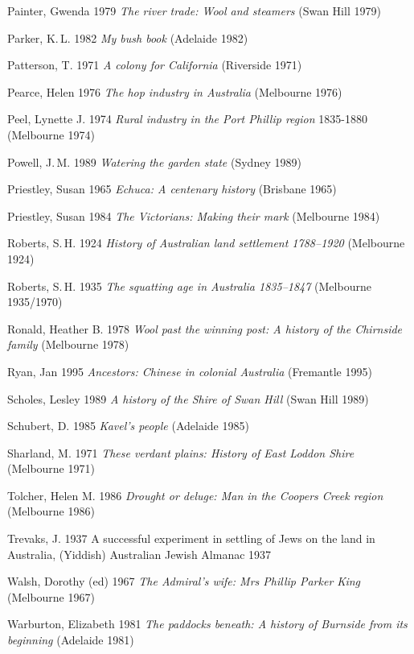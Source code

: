 Painter, Gwenda 1979 \textit{The river trade: Wool and steamers} (Swan
Hill 1979)

Parker, K.\,L.  1982 \textit{My bush book} (Adelaide 1982)

Patterson, T. 1971 \textit{A colony for California} (Riverside 1971)

Pearce, Helen 1976 \textit{The hop industry in Australia} (Melbourne
1976)

Peel, Lynette J. 1974 \textit{Rural industry in the Port Phillip
region} 1835-1880 (Melbourne 1974)

Powell, J.\,M. 1989 \textit{Watering the garden state} (Sydney 1989)

Priestley, Susan 1965 \textit{Echuca: A centenary history} (Brisbane
1965)

Priestley, Susan 1984 \textit{The Victorians: Making their mark}
(Melbourne 1984)

Roberts, S.\,H.  1924 \textit{History of Australian land settlement
1788--1920} (Melbourne 1924)

Roberts, S.\,H. 1935 \textit{The squatting age in Australia
1835--1847} (Melbourne 1935/1970)

Ronald, Heather B.  1978 \textit{Wool past the winning post: A history
of the Chirnside family} (Melbourne 1978)

Ryan, Jan 1995 \textit{Ancestors: Chinese in colonial Australia}
(Fremantle 1995)

Scholes, Lesley 1989 \textit{A history of the Shire of Swan Hill}
(Swan Hill 1989)

Schubert, D.  1985 \textit{Kavel's people} (Adelaide 1985)

Sharland, M.  1971 \textit{These verdant plains: History of East
Loddon Shire} (Melbourne 1971)

Tolcher, Helen M. 1986 \textit{Drought or deluge: Man in the Coopers
Creek region} (Melbourne 1986)

Trevaks, J. 1937 A successful experiment in settling of Jews on the
land in Australia, (Yiddish) Australian Jewish Almanac 1937

Walsh, Dorothy (ed) 1967 \textit{The Admiral's wife: Mrs Phillip
Parker King} (Melbourne 1967)

Warburton, Elizabeth 1981 \textit{The paddocks beneath: A history of
Burnside from its beginning} (Adelaide 1981)

